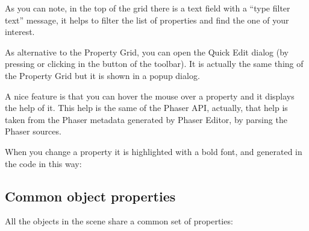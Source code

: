 \documentclass[letterpaper,10pt,english]{sphinxmanual}
\begin{document}
\noindent{}

As you can note, in the top of the grid there is a text field with a “type filter text” message, it helps to filter the list of properties and find the one of your interest.

As alternative to the Property Grid, you can open the Quick Edit dialog (by pressing  or clicking in the button of the toolbar). It is actually the same thing of the Property Grid but it is shown in a popup dialog.

A nice feature is that you can hover the mouse over a property and it displays the help of it. This help is the same of the Phaser API, actually, that help is taken from the Phaser metadata generated by Phaser Editor, by parsing the Phaser sources.

\noindent{}

When you change a property it is highlighted with a bold font, and generated in the code in this way:

\begin{sphinxVerbatim}[commandchars=\\\{\}]
     
   
\end{sphinxVerbatim}


\subsection{Common object properties}
\label{\detokenize{canvas:common-object-properties}}
All the objects in the scene share a common set of properties:
\end{document}
